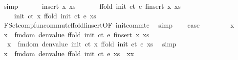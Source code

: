 \begin{isabellebody}
\ simp\isanewline
\ \ \isamarkupfalse%
\isanewline
{}\isamarkupfalse%
\isanewline
\ \ \isamarkupfalse%
\ {\isacharparenleft}{\kern0pt}insert\ x\ xs{\isacharparenright}{\kern0pt}\isanewline
\ \ \isamarkupfalse%
\ \isamarkupfalse%
\ {\isacharasterisk}{\kern0pt}{\isacharcolon}{\kern0pt}\ {\isachardoublequoteopen}ffold\ {\isacharparenleft}{\kern0pt}init\ ct{\isacharparenright}{\kern0pt}\ e\ {\isacharparenleft}{\kern0pt}finsert\ x\ xs{\isacharparenright}{\kern0pt}\ {\isacharequal}{\kern0pt}\isanewline
\ \ \ \ init\ ct\ x\ {\isacharparenleft}{\kern0pt}ffold\ {\isacharparenleft}{\kern0pt}init\ ct{\isacharparenright}{\kern0pt}\ e\ xs{\isacharparenright}{\kern0pt}{\isachardoublequoteclose}\ \isamarkupfalse%
\ FSet{\isachardot}{\kern0pt}comp{\isacharunderscore}{\kern0pt}fun{\isacharunderscore}{\kern0pt}commute{\isachardot}{\kern0pt}ffold{\isacharunderscore}{\kern0pt}finsert{\isacharbrackleft}{\kern0pt}OF\ init{\isacharunderscore}{\kern0pt}commte{\isacharbrackright}{\kern0pt}\ \isamarkupfalse%
\ simp\isanewline
\isanewline
\ \ \isamarkupfalse%
\ {\isacharquery}{\kern0pt}case\isanewline
\ \ \isamarkupfalse%
\isanewline
\ \ \ \ \isamarkupfalse%
\ x{\isacharprime}{\kern0pt}\ \isamarkupfalse%
\ {\isachardoublequoteopen}x{\isacharprime}{\kern0pt}\ {\isacharbar}{\kern0pt}{\isasymin}{\isacharbar}{\kern0pt}\ fmdom\ {\isacharparenleft}{\kern0pt}denvalue\ {\isacharparenleft}{\kern0pt}ffold\ {\isacharparenleft}{\kern0pt}init\ ct{\isacharparenright}{\kern0pt}\ e\ {\isacharparenleft}{\kern0pt}finsert\ x\ xs{\isacharparenright}{\kern0pt}{\isacharparenright}{\kern0pt}{\isacharparenright}{\kern0pt}{\isachardoublequoteclose}\isanewline
\ \ \ \ \isamarkupfalse%
\ {\isacharasterisk}{\kern0pt}\ \isamarkupfalse%
\ {\isacharasterisk}{\kern0pt}{\isacharasterisk}{\kern0pt}{\isacharcolon}{\kern0pt}\ {\isachardoublequoteopen}x{\isacharprime}{\kern0pt}\ {\isacharbar}{\kern0pt}{\isasymin}{\isacharbar}{\kern0pt}\ fmdom\ {\isacharparenleft}{\kern0pt}denvalue\ {\isacharparenleft}{\kern0pt}init\ ct\ x\ {\isacharparenleft}{\kern0pt}ffold\ {\isacharparenleft}{\kern0pt}init\ ct{\isacharparenright}{\kern0pt}\ e\ xs{\isacharparenright}{\kern0pt}{\isacharparenright}{\kern0pt}{\isacharparenright}{\kern0pt}{\isachardoublequoteclose}\ \isamarkupfalse%
\ simp\isanewline
\ \ \ \ \isamarkupfalse%
\ \isamarkupfalse%
\ {\isachardoublequoteopen}x{\isacharprime}{\kern0pt}\ {\isacharbar}{\kern0pt}{\isasymin}{\isacharbar}{\kern0pt}\ fmdom\ {\isacharparenleft}{\kern0pt}denvalue\ {\isacharparenleft}{\kern0pt}ffold\ {\isacharparenleft}{\kern0pt}init\ ct{\isacharparenright}{\kern0pt}\ e\ xs{\isacharparenright}{\kern0pt}{\isacharparenright}{\kern0pt}{\isachardoublequoteclose}\ {\isacharbar}{\kern0pt}\ {\isachardoublequoteopen}x{\isacharprime}{\kern0pt}{\isacharequal}{\kern0pt}x{\isachardoublequoteclose}\isanewline

\end{isabellebody}

